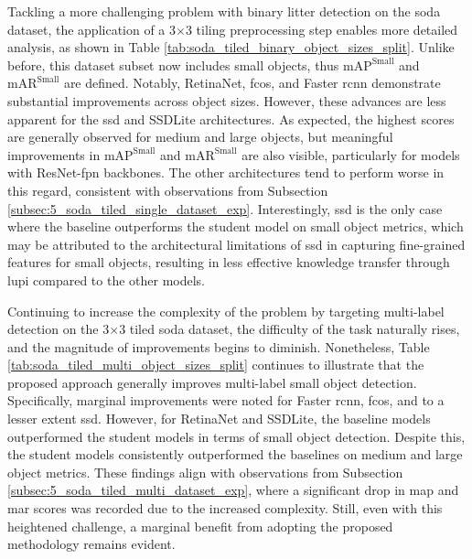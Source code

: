 Tackling a more challenging problem with binary litter detection on the \gls{soda} dataset, the application of a 3$\times$3 tiling preprocessing step enables more detailed analysis, as shown in Table \ref{tab:soda_tiled_binary_object_sizes_split}. Unlike before, this dataset subset now includes small objects, thus $\text{mAP}^{\text{Small}}$ and $\text{mAR}^{\text{Small}}$ are defined. Notably, RetinaNet, \gls{fcos}, and Faster \gls{rcnn} demonstrate substantial improvements across object sizes. However, these advances are less apparent for the \gls{ssd} and SSDLite architectures. As expected, the highest scores are generally observed for medium and large objects, but meaningful improvements in $\text{mAP}^{\text{Small}}$ and $\text{mAR}^{\text{Small}}$ are also visible, particularly for models with ResNet-\gls{fpn} backbones. The other architectures tend to perform worse in this regard, consistent with observations from Subsection \ref{subsec:5_soda_tiled_single_dataset_exp}. Interestingly, \gls{ssd} is the only case where the baseline outperforms the student model on small object metrics, which may be attributed to the architectural limitations of \gls{ssd} in capturing fine-grained features for small objects, resulting in less effective knowledge transfer through \gls{lupi} compared to the other models.

Continuing to increase the complexity of the problem by targeting multi-label detection on the 3$\times$3 tiled \gls{soda} dataset, the difficulty of the task naturally rises, and the magnitude of improvements begins to diminish. Nonetheless, Table \ref{tab:soda_tiled_multi_object_sizes_split} continues to illustrate that the proposed approach generally improves multi-label small object detection. Specifically, marginal improvements were noted for Faster \gls{rcnn}, \gls{fcos}, and to a lesser extent \gls{ssd}. However, for RetinaNet and SSDLite, the baseline models outperformed the student models in terms of small object detection. Despite this, the student models consistently outperformed the baselines on medium and large object metrics. These findings align with observations from Subsection \ref{subsec:5_soda_tiled_multi_dataset_exp}, where a significant drop in \gls{map} and \gls{mar} scores was recorded due to the increased complexity. Still, even with this heightened challenge, a marginal benefit from adopting the proposed methodology remains evident.

